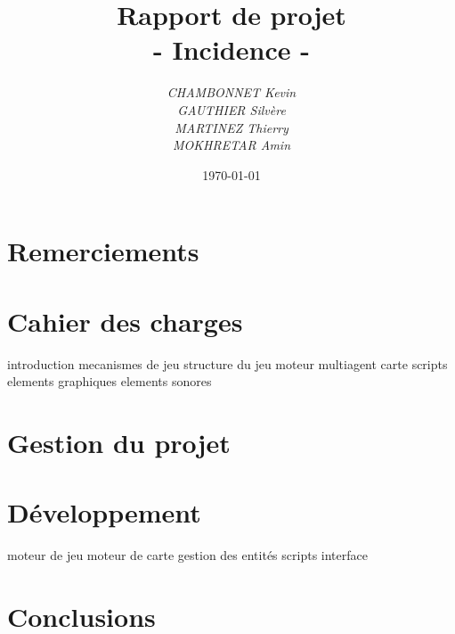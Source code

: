 \documentclass[a4paper]{article}
\title{\textbf{Rapport de projet}\\- \Huge{Incidence} -}
\author{\emph{CHAMBONNET Kevin}\\\emph{GAUTHIER Silvère}\\\emph{MARTINEZ Thierry}\\\emph{MOKHRETAR Amin}}
\date{\today}
\begin{document}
  \maketitle
  \newpage
  \tableofcontents

  \newpage
  \part{Remerciements}

  \newpage
  \part{Cahier des charges}
introduction
mecanismes de jeu
structure du jeu
	moteur
		multiagent
		carte
	scripts
elements graphiques
elements sonores

  \newpage
  \part{Gestion du projet}

  \newpage
  \part{Développement}
moteur de jeu
moteur de carte
gestion des entités
	scripts
interface

  \newpage
  \part{Conclusions}
\end{document}
